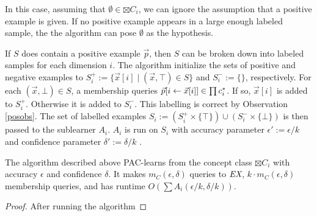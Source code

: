 In this case, assuming that $\emptyset \in \boxtimes C_i$, we can ignore the assumption that a positive example is given. 
If no positive example appears in a large enough labeled sample, the the algorithm can pose $\emptyset$ as the hypothesis.






If $S$ does contain a positive example $\vec{p}$, then $S$ can be broken down into labeled samples for each dimension $i$. 
The algorithm initialize the sets of positive and negative examples to $S^+_i := \{ \vec{x}[i] \mid  (\vec{x}, \top) \in S\}$ and $S^-_i := \{ \}$, respectively.
For each $(\vec{x}, \bot) \in S$, a membership queries $\vec{p}[i \leftarrow \vec{x}[i]] \in \prod c^*_i$. 
If so, $\vec{x}[i] $ is added to $S^+_i$.
Otherwise it is added to $S^-_i$.
This labelling is correct by Observation \ref{posobs}.
The set of labelled examples $S_i := (S_i^+ \times \{\top\}) \cup (S_i^- \times \{\bot\})$ is then passed to the sublearner $A_i$.
$A_i$ is run on $S_i$ with accuracy parameter $\epsilon' := \epsilon / k$ and confidence parameter $\delta' := \delta / k$ .


\begin{proposition}
The algorithm described above PAC-learns from the concept class $\boxtimes C_i$ with accuracy $\epsilon$ and confidence $\delta$.
It makes $m_C(\epsilon, \delta)$ queries to $\emph{EX}$, $k \cdot m_C(\epsilon, \delta)$ membership queries, and has runtime $O(\sum A_i(\epsilon / k, \delta / k))$.
\end{proposition}
\begin{proof}
After running the algorithm 
\end{proof}

\fi



